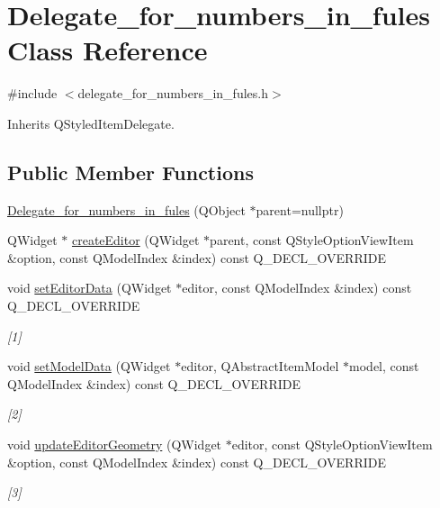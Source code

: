 \hypertarget{classDelegate__for__numbers__in__fules}{}\section{Delegate\+\_\+for\+\_\+numbers\+\_\+in\+\_\+fules Class Reference}
\label{classDelegate__for__numbers__in__fules}


{\ttfamily \#include $<$delegate\+\_\+for\+\_\+numbers\+\_\+in\+\_\+fules.\+h$>$}



Inherits Q\+Styled\+Item\+Delegate.

\subsection*{Public Member Functions}
\begin{DoxyCompactItemize}
\item 
\hyperlink{classDelegate__for__numbers__in__fules_a063ab9cc8f84dc63285f863f6b447562}{Delegate\+\_\+for\+\_\+numbers\+\_\+in\+\_\+fules} (Q\+Object $\ast$parent=nullptr)
\item 
Q\+Widget $\ast$ \hyperlink{classDelegate__for__numbers__in__fules_a08e0cd3a839dbef91678350bf25dd163}{create\+Editor} (Q\+Widget $\ast$parent, const Q\+Style\+Option\+View\+Item \&option, const Q\+Model\+Index \&index) const Q\+\_\+\+D\+E\+C\+L\+\_\+\+O\+V\+E\+R\+R\+I\+DE
\item 
void \hyperlink{classDelegate__for__numbers__in__fules_a8ed7d13b0ce16e8c830de737d5354725}{set\+Editor\+Data} (Q\+Widget $\ast$editor, const Q\+Model\+Index \&index) const Q\+\_\+\+D\+E\+C\+L\+\_\+\+O\+V\+E\+R\+R\+I\+DE
\begin{DoxyCompactList}\small\item\em \mbox{[}1\mbox{]} \end{DoxyCompactList}\item 
void \hyperlink{classDelegate__for__numbers__in__fules_a0f0422051323d15ae95017008aa1bac1}{set\+Model\+Data} (Q\+Widget $\ast$editor, Q\+Abstract\+Item\+Model $\ast$model, const Q\+Model\+Index \&index) const Q\+\_\+\+D\+E\+C\+L\+\_\+\+O\+V\+E\+R\+R\+I\+DE
\begin{DoxyCompactList}\small\item\em \mbox{[}2\mbox{]} \end{DoxyCompactList}\item 
void \hyperlink{classDelegate__for__numbers__in__fules_a2c2d5f81ed07f0992f692e6858d13aaf}{update\+Editor\+Geometry} (Q\+Widget $\ast$editor, const Q\+Style\+Option\+View\+Item \&option, const Q\+Model\+Index \&index) const Q\+\_\+\+D\+E\+C\+L\+\_\+\+O\+V\+E\+R\+R\+I\+DE
\begin{DoxyCompactList}\small\item\em \mbox{[}3\mbox{]} \end{DoxyCompactList}\end{DoxyCompactItemize}


